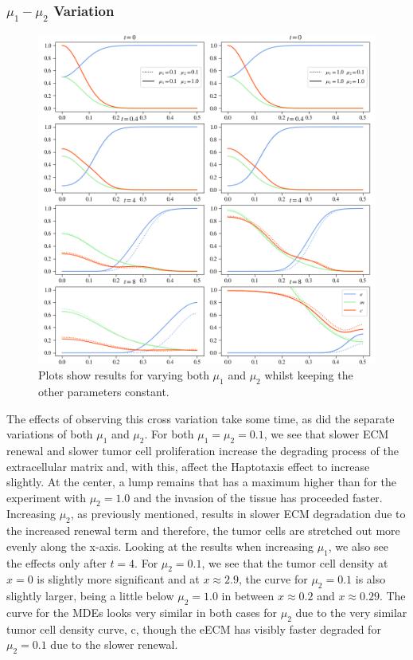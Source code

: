 \subsubsection*{$\mu_1 - \mu_2$ Variation}
\begin{figure}[h!]
    \centering
    \includegraphics[width=\textwidth]{resources/images/prolif_mu_1_mu_2_variation.png}
    \caption{Plots show results for varying both $\mu_1$ and $\mu_2$ whilst keeping the other parameters constant.}
    \label{fig:prolif_mu_1_mu_2_variation}
\end{figure}
The effects of observing this cross variation take some time, as did the separate variations of both $\mu_1$ and $\mu_2$. For both $\mu_1=\mu_2=0.1$, we see that slower ECM renewal and slower tumor cell proliferation increase the degrading process of the extracellular matrix and, with this, affect the Haptotaxis effect to increase slightly. At the center, a lump remains that has a maximum higher than for the experiment with $\mu_2=1.0$ and the invasion of the tissue has proceeded faster. Increasing $\mu_2$, as previously mentioned, results in slower ECM degradation due to the increased renewal term and therefore, the tumor cells are stretched out more evenly along the x-axis. Looking at the results when increasing $\mu_1$, we also see the effects only after $t=4$. For $\mu_2=0.1$, we see that the tumor cell density at $x=0$ is slightly more significant and at $x\approx 2.9$, the curve for $\mu_2=0.1$ is also slightly larger, being a little below $\mu_2=1.0$ in between $x\approx 0.2$ and $x\approx 0.29$. The curve for the MDEs looks very similar in both cases for $\mu_2$ due to the very similar tumor cell density curve, c, though the eECM has visibly faster degraded for $\mu_2=0.1$ due to the slower renewal.

